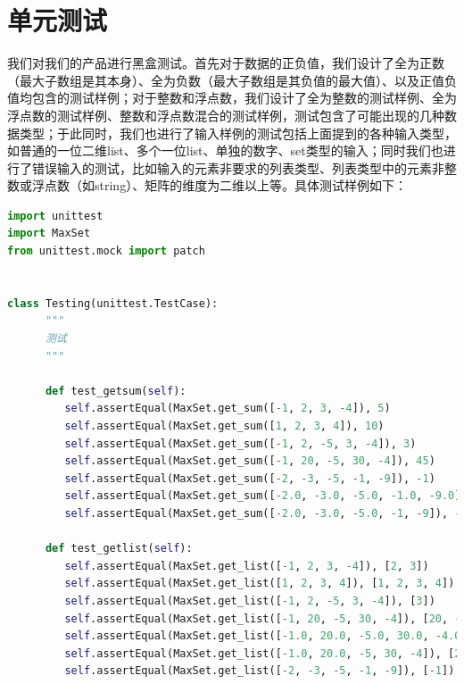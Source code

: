 \documentclass{article}
\begin{document}
\section{单元测试}
我们对我们的产品进行黑盒测试。首先对于数据的正负值，我们设计了全为正数（最大子数组是其本身）、全为负数（最大子数组是其负值的最大值）、以及正值负值均包含的测试样例；对于整数和浮点数，我们设计了全为整数的测试样例、全为浮点数的测试样例、整数和浮点数混合的测试样例，测试包含了可能出现的几种数据类型；于此同时，我们也进行了输入样例的测试包括上面提到的各种输入类型，如普通的一位二维list、多个一位list、单独的数字、set类型的输入；同时我们也进行了错误输入的测试，比如输入的元素非要求的列表类型、列表类型中的元素非整数或浮点数（如string）、矩阵的维度为二维以上等。具体测试样例如下：
\begin{lstlisting}[language = python]
import unittest
import MaxSet
from unittest.mock import patch


class Testing(unittest.TestCase):
      """
      测试
      """

      def test_getsum(self):
         self.assertEqual(MaxSet.get_sum([-1, 2, 3, -4]), 5)
         self.assertEqual(MaxSet.get_sum([1, 2, 3, 4]), 10)
         self.assertEqual(MaxSet.get_sum([-1, 2, -5, 3, -4]), 3)
         self.assertEqual(MaxSet.get_sum([-1, 20, -5, 30, -4]), 45)
         self.assertEqual(MaxSet.get_sum([-2, -3, -5, -1, -9]), -1)
         self.assertEqual(MaxSet.get_sum([-2.0, -3.0, -5.0, -1.0, -9.0]), -1)
         self.assertEqual(MaxSet.get_sum([-2.0, -3.0, -5.0, -1, -9]), -1)

      def test_getlist(self):
         self.assertEqual(MaxSet.get_list([-1, 2, 3, -4]), [2, 3])
         self.assertEqual(MaxSet.get_list([1, 2, 3, 4]), [1, 2, 3, 4])
         self.assertEqual(MaxSet.get_list([-1, 2, -5, 3, -4]), [3])
         self.assertEqual(MaxSet.get_list([-1, 20, -5, 30, -4]), [20, -5, 30])
         self.assertEqual(MaxSet.get_list([-1.0, 20.0, -5.0, 30.0, -4.0]), [20.0, -5.0, 30.0])
         self.assertEqual(MaxSet.get_list([-1.0, 20.0, -5, 30, -4]), [20.0, -5, 30])
         self.assertEqual(MaxSet.get_list([-2, -3, -5, -1, -9]), [-1])


\end{lstlisting}
\end{document}
